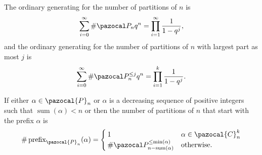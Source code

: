 \begin{lemma}
  The ordinary generating for the number of partitions of $n$ is \begin{equation}
    \sum_{i=0}^\infty \#\pazocal P_n q^n = \prod_{i=1}^\infty \frac{1}{1-q^j},
  \end{equation}
  and the ordinary generating for the number of partitions of $n$ with largest part
  as most $j$ is \begin{equation}
    \sum_{i=0}^\infty \#\pazocal P_n^{\leq j} q^n = \prod_{i=1}^k \frac{1}{1-q^j}.
  \end{equation}
\end{lemma}

\begin{proposition}
  If either $\alpha \in \pazocal{P}_n$ or $\alpha$ is
  a decreasing sequence of positive integers such that
  ${\operatorname{sum}(\alpha) < n}$ or
  then the number of partitions of $n$ that start with the prefix $\alpha$
  is \begin{equation}
    \#\operatorname{prefix}_{\pazocal{P}_n}(\alpha) = \begin{cases}
      1 & \alpha \in \pazocal{C}_n^{k} \\
      \#\pazocal P_{n-\operatorname{sum}(\alpha)}^{\leq \operatorname{min}(\alpha)} & \text{otherwise}.
    \end{cases}
  \end{equation}
\end{proposition}
